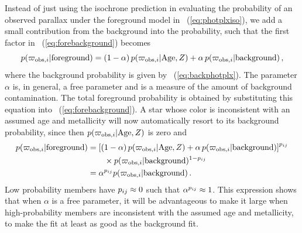 Instead of just using the isochrone prediction in evaluating the
probability of an observed parallax under the foreground model in
\eqnname~(\ref{eq:photplxiso}), we add a small contribution from the
background into the probability, such that the first factor in
\eqnname~(\ref{eq:forebackground}) becomes
\begin{equation}\label{eq:photplxfore}
p(\varpi_{\mathrm{obs},i} | \mathrm{foreground}) = (1-\alpha)\,p(\varpi_{\mathrm{obs},i} | \mathrm{Age},Z) + \alpha \,p(\varpi_{\mathrm{obs},i} | \mathrm{background})\,,
\end{equation}
where the background probability is given by
\eqnname~(\ref{eq:backphotplx}). The parameter $\alpha$ is, in
general, a free parameter and is a measure of the amount of background
contamination. The total foreground probability is obtained by
substituting this equation into \eqnname~(\ref{eq:forebackground}). A
star whose color is inconsistent with an assumed age and metallicity
will now automatically resort to its background probability, since
then $p(\varpi_{\mathrm{obs},i} | \mathrm{Age},Z)$ is zero and
\begin{equation}
\begin{split}
p(\varpi_{\mathrm{obs},i} | \mathrm{foreground}) &= \left[(1-\alpha)\,p(\varpi_{\mathrm{obs},i} | \mathrm{Age},Z) + \alpha \,p(\varpi_{\mathrm{obs},i} | \mathrm{background})
\right]^{p_{ij}}\\
& \qquad \times p(\varpi_{\mathrm{obs},i} | \mathrm{background})^{1-p_{ij}} \\
&= \alpha^{p_{ij}} p(\varpi_{\mathrm{obs},i} | \mathrm{background})\,.
\end{split}
\end{equation}
Low probability members have $p_{ij} \approx 0$ such that $\alpha^{p_{ij}}
\approx 1$. This expression shows that when $\alpha$ is a free
parameter, it will be advantageous to make it large when
high-probability members are inconsistent with the assumed age and
metallicity, to make the fit at least as good as the background fit.

